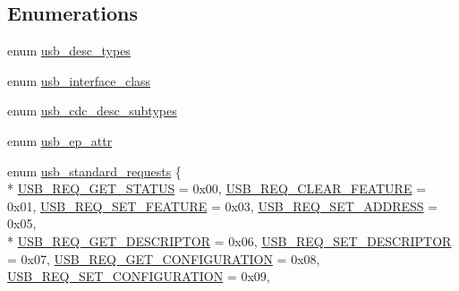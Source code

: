 \subsection*{Enumerations}
\begin{DoxyCompactItemize}
\item 
enum \hyperlink{group___p_i_o_s___u_s_b___d_e_f_s_ga15dc30e657ffe4355ba53c2254eb28b5}{usb\-\_\-desc\-\_\-types} 
\item 
enum \hyperlink{group___p_i_o_s___u_s_b___d_e_f_s_ga8c0df0a6c06d39e56e7b15ba8e9d699e}{usb\-\_\-interface\-\_\-class} 
\item 
enum \hyperlink{group___p_i_o_s___u_s_b___d_e_f_s_gadb2dd8c2f3bfb704ccb6629b322f8703}{usb\-\_\-cdc\-\_\-desc\-\_\-subtypes} 
\item 
enum \hyperlink{group___p_i_o_s___u_s_b___d_e_f_s_ga15c24f2eca3cd0a9c359f4e66cb82523}{usb\-\_\-ep\-\_\-attr} 
\item 
enum \hyperlink{group___p_i_o_s___u_s_b___d_e_f_s_ga656cd9a1af7abe6ec812f6ee50b223f9}{usb\-\_\-standard\-\_\-requests} \{ \\*
\hyperlink{group___p_i_o_s___u_s_b___d_e_f_s_gga656cd9a1af7abe6ec812f6ee50b223f9aa3f531db07d9720f1c27d383f17b41e7}{U\-S\-B\-\_\-\-R\-E\-Q\-\_\-\-G\-E\-T\-\_\-\-S\-T\-A\-T\-U\-S} = 0x00, 
\hyperlink{group___p_i_o_s___u_s_b___d_e_f_s_gga656cd9a1af7abe6ec812f6ee50b223f9a3e7df41451462e9647ea51127b1029cb}{U\-S\-B\-\_\-\-R\-E\-Q\-\_\-\-C\-L\-E\-A\-R\-\_\-\-F\-E\-A\-T\-U\-R\-E} = 0x01, 
\hyperlink{group___p_i_o_s___u_s_b___d_e_f_s_gga656cd9a1af7abe6ec812f6ee50b223f9ac6f6f92b41b3626f3bee5585bc8ad259}{U\-S\-B\-\_\-\-R\-E\-Q\-\_\-\-S\-E\-T\-\_\-\-F\-E\-A\-T\-U\-R\-E} = 0x03, 
\hyperlink{group___p_i_o_s___u_s_b___d_e_f_s_gga656cd9a1af7abe6ec812f6ee50b223f9a83a1bafe1cb5a0722e661037a7409d38}{U\-S\-B\-\_\-\-R\-E\-Q\-\_\-\-S\-E\-T\-\_\-\-A\-D\-D\-R\-E\-S\-S} = 0x05, 
\\*
\hyperlink{group___p_i_o_s___u_s_b___d_e_f_s_gga656cd9a1af7abe6ec812f6ee50b223f9a1eefe8e6e18013141d267fc8aba28b10}{U\-S\-B\-\_\-\-R\-E\-Q\-\_\-\-G\-E\-T\-\_\-\-D\-E\-S\-C\-R\-I\-P\-T\-O\-R} = 0x06, 
\hyperlink{group___p_i_o_s___u_s_b___d_e_f_s_gga656cd9a1af7abe6ec812f6ee50b223f9a2297324ad7de09fcff189cb08b6e3357}{U\-S\-B\-\_\-\-R\-E\-Q\-\_\-\-S\-E\-T\-\_\-\-D\-E\-S\-C\-R\-I\-P\-T\-O\-R} = 0x07, 
\hyperlink{group___p_i_o_s___u_s_b___d_e_f_s_gga656cd9a1af7abe6ec812f6ee50b223f9a70ecb7290067da81c599637126d78c32}{U\-S\-B\-\_\-\-R\-E\-Q\-\_\-\-G\-E\-T\-\_\-\-C\-O\-N\-F\-I\-G\-U\-R\-A\-T\-I\-O\-N} = 0x08, 
\hyperlink{group___p_i_o_s___u_s_b___d_e_f_s_gga656cd9a1af7abe6ec812f6ee50b223f9a8469bf7cfc2e560c005b564fe66db0ee}{U\-S\-B\-\_\-\-R\-E\-Q\-\_\-\-S\-E\-T\-\_\-\-C\-O\-N\-F\-I\-G\-U\-R\-A\-T\-I\-O\-N} = 0x09, 

\end{DoxyCompactItemize}
